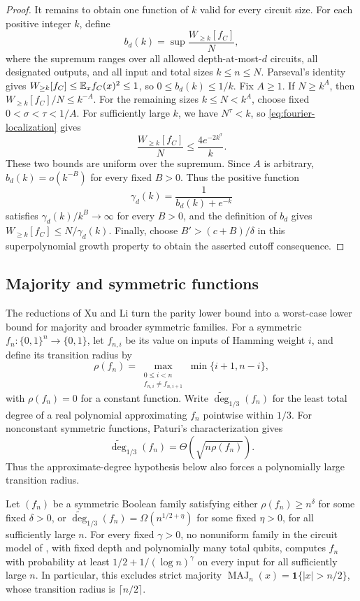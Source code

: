 \begin{proof}
It remains to obtain one function of $k$ valid for every circuit size.
For each positive integer $k$, define
\[
 b_d(k)=\sup\frac{W_{\ge k}[f_C]}{N},
\]
where the supremum ranges over all allowed depth-at-most-$d$ circuits,
all designated outputs, and all input and total sizes $k\le n\le N$.
Parseval's identity gives $W_{\ge k}[f_C]\le\mathbb E_x f_C(x)^2\le1$,
so $0\le b_d(k)\le1/k$.
Fix $A\ge1$. If $N\ge k^A$, then $W_{\ge k}[f_C]/N\le k^{-A}$.
For the remaining sizes $k\le N<k^A$, choose fixed
$0<\sigma<\tau<1/A$. For sufficiently large $k$, we have
$N^\tau<k$, so \eqref{eq:fourier-localization} gives
\[
 \frac{W_{\ge k}[f_C]}{N}\le\frac{4e^{-2k^\sigma}}{k}.
\]
These two bounds are uniform over the supremum. Since $A$ is arbitrary,
$b_d(k)=o(k^{-B})$ for every fixed $B>0$.
Thus the positive function
\[
 \gamma_d(k)=\frac1{b_d(k)+e^{-k}}
\]
satisfies $\gamma_d(k)/k^B\to\infty$ for every $B>0$, and the definition
of $b_d$ gives $W_{\ge k}[f_C]\le N/\gamma_d(k)$.
Finally, choose $B'>(c+B)/\delta$ in this superpolynomial growth
property to obtain the asserted cutoff consequence.
\end{proof}

\subsection{Majority and symmetric functions}

The reductions of Xu and Li turn the parity lower bound into a
worst-case lower bound for majority and broader symmetric families.
For a symmetric \(f_n:\{0,1\}^n\to\{0,1\}\), let \(f_{n,i}\) be its
value on inputs of Hamming weight \(i\), and define its transition radius by
\[
 \rho(f_n)=\max_{\substack{0\le i<n\\f_{n,i}\ne f_{n,i+1}}}
                 \min\{i+1,n-i\},
\]
with \(\rho(f_n)=0\) for a constant function. Write
\(\widetilde{\deg}_{1/3}(f_n)\) for the least total degree of a real
polynomial approximating \(f_n\) pointwise within \(1/3\).
For nonconstant symmetric functions, Paturi's characterization
\cite[Theorem~1]{Paturi1992} gives
\[
 \widetilde{\deg}_{1/3}(f_n)=\Theta\!\left(\sqrt{n\rho(f_n)}\right).
\]
Thus the approximate-degree hypothesis below also forces a polynomially
large transition radius.

\begin{corollary}
\label{cor:symmetric-functions}
Let \((f_n)\) be a symmetric Boolean family satisfying either
\(\rho(f_n)\ge n^\delta\) for some fixed \(\delta>0\), or
\(\widetilde{\deg}_{1/3}(f_n)=\Omega(n^{1/2+\eta})\) for some fixed
\(\eta>0\), for all sufficiently large \(n\). For every fixed
\(\gamma>0\), no nonuniform family in the circuit model of
, with fixed depth and polynomially many total qubits,
computes \(f_n\) with probability at least
\(1/2+1/(\log n)^\gamma\) on every input for all sufficiently large \(n\).
In particular, this excludes strict majority
\(\operatorname{MAJ}_n(x)=\mathbf 1\{|x|>n/2\}\), whose transition radius
is \(\lceil n/2\rceil\).
\end{corollary}

